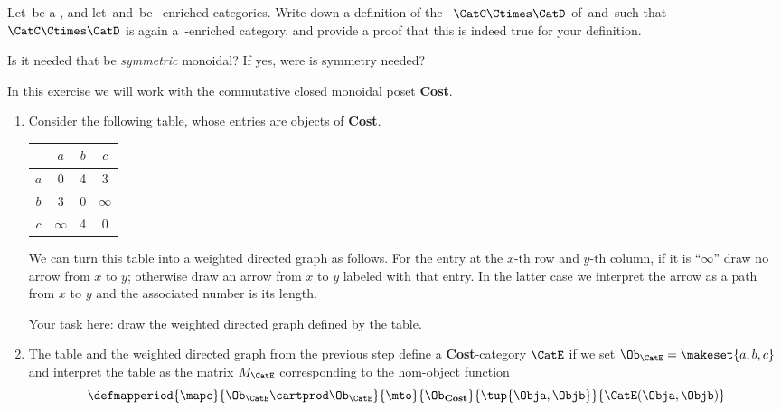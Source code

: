 
\begin{gradedexercise}
    \label{ex:ProductOfEnrichedCats}
    Let~\CatV be a , and let~\CatC and~\CatD be~\CatV-enriched categories.
    Write down a definition of the ~$\CatC \Ctimes \CatD$ of~\CatC and~\CatD such that~$\CatC \Ctimes \CatD$ is again a~\CatV-enriched category, and provide a proof that this is indeed true for your definition.

    Is it needed that \CatV be \emph{symmetric} monoidal?
    If yes, were is symmetry needed?
\end{gradedexercise}

\begin{gradedexercise}
    \label{ex:HwkCostMatrices}

    In this exercise we will work with the commutative closed monoidal poset \textbf{Cost}.

    \begin{enumerate}
        \item Consider the following table, whose entries are objects of \textbf{Cost}.

              \begin{center}
                  \begin{tabular}{c|ccc}
                          & $a$      & $b$ & $c$ \\
                      \hline
                      $a$ & 0        & 4   & 3 \\
                      $b$ & 3        & 0   & $\infty$ \\
                      $c$ & $\infty$ & 4   & 0
                  \end{tabular}
              \end{center}

              We can turn this table into a weighted directed graph as follows.
              For the entry at the $x$-th row and $y$-th column, if it is ``$\infty$'' draw no arrow from $x$ to $y$; otherwise draw an arrow from $x$ to $y$ labeled with that entry.
              In the latter case we interpret the arrow as a path from $x$ to $y$ and the associated number is its length.

              Your task here: draw the weighted directed graph defined by the table.

        \item The table and the weighted directed graph from the previous step define a \textbf{Cost}-category $\CatE$ if we set $\Ob_\CatE = \makeset{a, b, c}$ and interpret the table as the matrix $M_\CatE$ corresponding to the hom-object function
              \begin{equation}
                  \defmapperiod{\mapc}{\Ob_\CatE \cartprod \Ob_\CatE}{\mto}{\Ob_\textbf{Cost}}{\tup{\Obja, \Objb}}{\CatE(\Obja, \Objb)}
              \end{equation}


\end{enumerate}
\end{gradedexercise}
